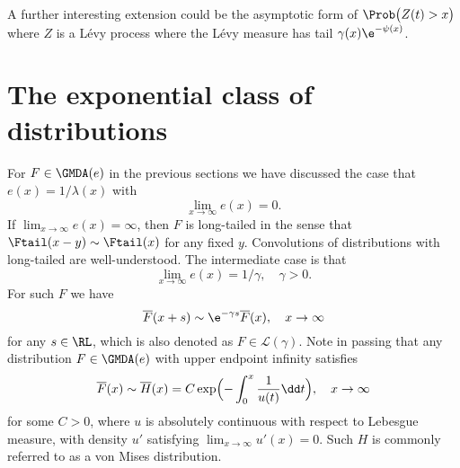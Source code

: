 A further interesting extension could be the asymptotic form of $\Prob\bigl(Z(t)>x\bigr)$ where $Z$ is
a L\'evy process where the L\'evy measure has tail $\gamma(x)\e^{-\psi(x)}$.



\section{The exponential class of distributions}\label{C1C2}
For $F\in \GMDA(e)$ in the previous sections we have discussed the case that $e(x)=1/\lambda(x)$ with
	$$ \lim_{x\to \infty} e(x)= 0.$$
	If $\lim_{x\to \infty} e(x)=\infty$, then $F$ is long-tailed in the sense that
	$ \Ftail(x- y) \sim \Ftail(x)$ for any fixed $y$. Convolutions of distributions with long-tailed are well-understood. The intermediate case is that
	$$ \lim_{x\to \infty} e(x)= 1/\gamma, \quad \gamma>0.$$
	For such $F$ we have
	$$ 	\overline  F( x+ s) \sim \e^{-\gamma s} 	\overline  F(x), \quad x\to \infty$$
	for any $s\in \RL$, which is also denoted as
	$F \in \mathcal{L}(\gamma)$.
	Note in passing that any distribution $F \in \GMDA(e)$ with upper endpoint infinity satisfies \cite[Prop.\,1.4]{resnick2013extreme}
	\begin{equation} \label{polin}
		\overline  F(x) \sim  	\overline  H(x)= C \exp\Bigl(- \int_0^x \frac{1}{u(t)} \dd t\Bigr), \quad x\to \infty
	\end{equation}
	for some $C>0$, where $u$ is absolutely continuous with respect to Lebesgue measure, with density $u'$ satisfying  $\lim_{x\to \infty} u'(x)=0$.  Such $H$ is commonly referred to as a von Mises distribution.

